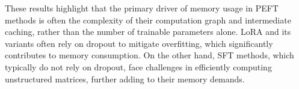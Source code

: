 
These results highlight that the primary driver of memory usage in PEFT methods is often the complexity of their computation graph and intermediate caching, rather than the number of trainable parameters alone. LoRA and its variants often rely on dropout to mitigate overfitting, which significantly contributes to memory consumption. On the other hand, SFT methods, which typically do not rely on dropout, face challenges in efficiently computing unstructured matrices, further adding to their memory demands.
